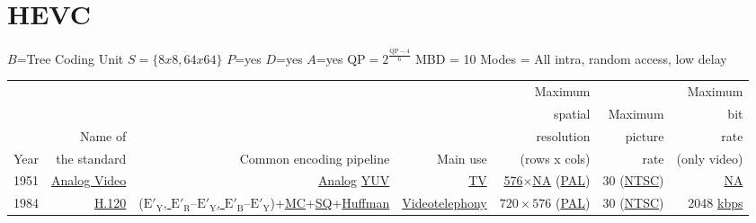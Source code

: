 \section{HEVC}

$B$=Tree Coding Unit
$S=\{8x8, 64x64\}$
$P$=yes
$D$=yes
$A$=yes
$\text{QP}=2^{\frac{\text{QP}-4}{6}}$
MBD = 10
Modes = All intra, random access, low delay

\begin{tabular}{lrrrrrr}
     &              &                          &          &       Maximum &         & Maximum \\
     &              &                          &          &       spatial & Maximum & bit \\
     &     Name of  &                          &          &    resolution & picture & rate \\
Year & the standard & Common encoding pipeline & Main use & (rows x cols) &    rate & (only video)\\
\hline

1951 & %
\href{https://en.wikipedia.org/wiki/Video#Analog_video}{Analog Video} & %
\href{https://en.wikipedia.org/wiki/Analog_signal}{Analog} \href{https://en.wikipedia.org/wiki/YUV}{YUV} & %
\href{https://en.wikipedia.org/wiki/Television}{TV} & %
\href{https://en.wikipedia.org/wiki/Interlaced_video}{576}$\times$\href{https://en.wikipedia.org/wiki/N/A}{NA} (\href{https://en.wikipedia.org/wiki/PAL}{PAL}) & %
30 (\href{https://en.wikipedia.org/wiki/NTSC}{NTSC}) & %
\href{https://en.wikipedia.org/wiki/N/A}{NA} \\ %

1984 & %
\href{https://en.wikipedia.org/wiki/H.120}{H.120} & %
(\href{https://en.wikipedia.org/wiki/Chroma_subsampling#4:2:2}{$\text{E}'_\text{Y}$, $\text{E}'_\text{R} – \text{E}'_\text{Y}$, $\text{E}'_\text{B} – \text{E}'_\text{Y}$})+\href{https://en.wikipedia.org/wiki/Motion_compensation}{MC}+\href{https://en.wikipedia.org/wiki/Quantization_(signal_processing)}{SQ}+\href{https://en.wikipedia.org/wiki/Huffman_coding}{Huffman} & %
\href{https://en.wikipedia.org/wiki/Videotelephony}{Videotelephony} & %
$720\times 576$ (\href{https://en.wikipedia.org/wiki/PAL}{PAL}) & %
30 (\href{https://en.wikipedia.org/wiki/NTSC}{NTSC}) & %
2048 \href{https://en.wikipedia.org/wiki/Data-rate_units}{kbps} \\ %


\end{tabular}
